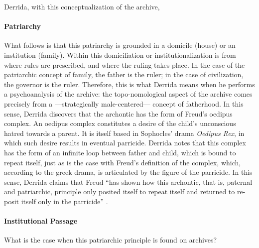 	Derrida, with this conceptualization of the archive,
	


	\paragraph{Patriarchy}
	What follows is that this patriarchy is grounded in a domicile (house) or an institution (family). Within this domiciliation or institutionalization is from where rules are prescribed, and where the ruling takes place. In the case of the patriarchic concept of family, the father is the ruler; in the case of civilization, the governor is the ruler. Therefore, this is what Derrida means when he performs a psychoanalysis of the archive: the topo-nomological aspect of the archive comes precisely from a ---strategically male-centered--- concept of fatherhood. In this sense, Derrida discovers that the archontic has the form of Freud's oedipus complex. An oedipus complex constitutes a desire of the child's unconscious hatred towards a parent. It is itself based in Sophocles' drama \textit{Oedipus Rex}, in which such desire results in eventual parricide. Derrida notes that this complex has the form of an infinite loop between father and child, which is bound to repeat itself, just as is the case with Freud's definition of the complex, which, according to the greek drama, is articulated by the figure of the parricide. In this sense, Derrida claims that Freud ``has shown how this archontic, that is, paternal and patriarchic, principle only posited itself to repeat itself and returned to re-posit itself only in the parricide'' \parencite[60]{Der95:Arc}.

	\paragraph{Institutional Passage}
	What is the case when this patriarchic principle is found on archives? 


	




